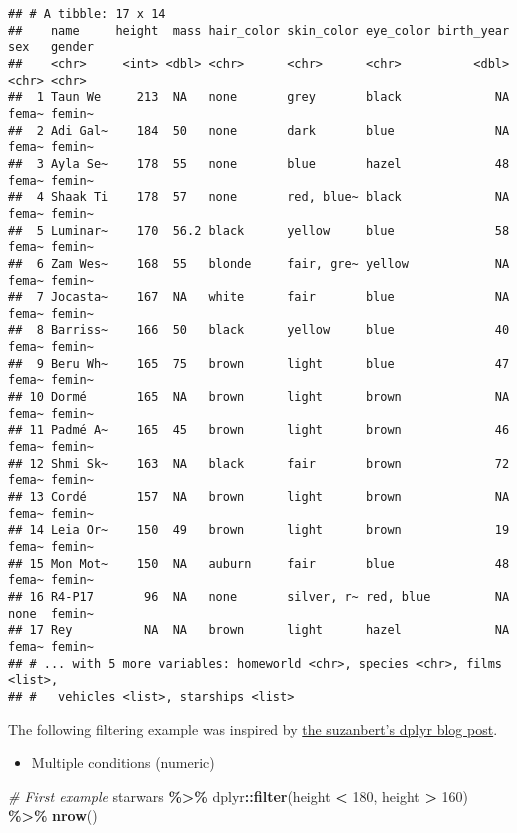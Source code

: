 \documentclass[
]{book}
\newenvironment{Shaded}{\begin{snugshade}}{\end{snugshade}}
\newcommand{\CommentTok}[1]{\textcolor[rgb]{0.56,0.35,0.01}{\textit{#1}}}
\newcommand{\DecValTok}[1]{\textcolor[rgb]{0.00,0.00,0.81}{#1}}
\newcommand{\KeywordTok}[1]{\textcolor[rgb]{0.13,0.29,0.53}{\textbf{#1}}}
\newcommand{\NormalTok}[1]{#1}
\newcommand{\OperatorTok}[1]{\textcolor[rgb]{0.81,0.36,0.00}{\textbf{#1}}}
\newcommand{\StringTok}[1]{\textcolor[rgb]{0.31,0.60,0.02}{#1}}
\providecommand{\tightlist}{%
  \setlength{\itemsep}{0pt}\setlength{\parskip}{0pt}}
\begin{document}
\begin{verbatim}
## # A tibble: 17 x 14
##    name     height  mass hair_color skin_color eye_color birth_year sex   gender
##    <chr>     <int> <dbl> <chr>      <chr>      <chr>          <dbl> <chr> <chr> 
##  1 Taun We     213  NA   none       grey       black             NA fema~ femin~
##  2 Adi Gal~    184  50   none       dark       blue              NA fema~ femin~
##  3 Ayla Se~    178  55   none       blue       hazel             48 fema~ femin~
##  4 Shaak Ti    178  57   none       red, blue~ black             NA fema~ femin~
##  5 Luminar~    170  56.2 black      yellow     blue              58 fema~ femin~
##  6 Zam Wes~    168  55   blonde     fair, gre~ yellow            NA fema~ femin~
##  7 Jocasta~    167  NA   white      fair       blue              NA fema~ femin~
##  8 Barriss~    166  50   black      yellow     blue              40 fema~ femin~
##  9 Beru Wh~    165  75   brown      light      blue              47 fema~ femin~
## 10 Dormé       165  NA   brown      light      brown             NA fema~ femin~
## 11 Padmé A~    165  45   brown      light      brown             46 fema~ femin~
## 12 Shmi Sk~    163  NA   black      fair       brown             72 fema~ femin~
## 13 Cordé       157  NA   brown      light      brown             NA fema~ femin~
## 14 Leia Or~    150  49   brown      light      brown             19 fema~ femin~
## 15 Mon Mot~    150  NA   auburn     fair       blue              48 fema~ femin~
## 16 R4-P17       96  NA   none       silver, r~ red, blue         NA none  femin~
## 17 Rey          NA  NA   brown      light      hazel             NA fema~ femin~
## # ... with 5 more variables: homeworld <chr>, species <chr>, films <list>,
## #   vehicles <list>, starships <list>
\end{verbatim}

The following filtering example was inspired by \href{https://suzan.rbind.io/2018/02/dplyr-tutorial-3/}{the suzanbert's dplyr blog post}.

\begin{itemize}
\tightlist
\item
  Multiple conditions (numeric)
\end{itemize}

\begin{Shaded}
\begin{Highlighting}[]
\CommentTok{\# First example}
\NormalTok{starwars }\OperatorTok{\%\textgreater{}\%}
\StringTok{  }\NormalTok{dplyr}\OperatorTok{::}\KeywordTok{filter}\NormalTok{(height }\OperatorTok{\textless{}}\StringTok{ }\DecValTok{180}\NormalTok{, height }\OperatorTok{\textgreater{}}\StringTok{ }\DecValTok{160}\NormalTok{) }\OperatorTok{\%\textgreater{}\%}
\StringTok{  }\KeywordTok{nrow}\NormalTok{()}
\end{Highlighting}
\end{Shaded}
\end{document}
